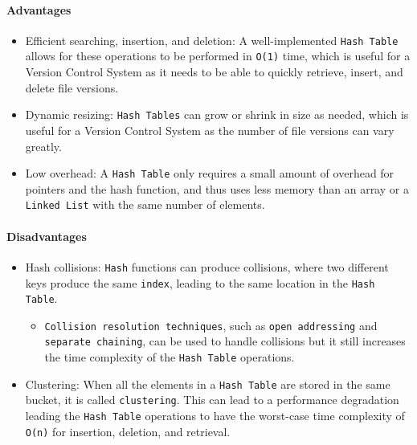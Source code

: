 

\paragraph{Advantages}
\begin{itemize}
    \item Efficient searching, insertion, and deletion: A well-implemented \lstinline{Hash Table} allows for these operations to be performed in \lstinline{O(1)} time, which is useful for a Version Control System as it needs to be able to quickly retrieve, insert, and delete file versions.
    \item Dynamic resizing: \lstinline{Hash Tables} can grow or shrink in size as needed, which is useful for a Version Control System as the number of file versions can vary greatly.
    \item Low overhead: A \lstinline{Hash Table} only requires a small amount of overhead for pointers and the hash function, and thus uses less memory than an array or a \lstinline{Linked List} with the same number of elements.
\end{itemize}
\paragraph{Disadvantages}
\begin{itemize}
    \item{Hash collisions: \lstinline{Hash} functions can produce collisions, where two different keys produce the same \lstinline{index}, leading to the same location in the \lstinline{Hash Table}.}
    \begin{itemize}
        \item{\lstinline{Collision resolution techniques}, such as \lstinline{open addressing} and \lstinline{separate chaining}, can be used to handle collisions but it still increases the time complexity of the \lstinline{Hash Table} operations.}
    \end{itemize}
    \item Clustering: When all the elements in a \lstinline{Hash Table} are stored in the same bucket, it is called \lstinline{clustering}. This can lead to a performance degradation leading the \lstinline{Hash Table} operations to have the worst-case time complexity of \lstinline{O(n)} for insertion, deletion, and retrieval.
\end{itemize}

